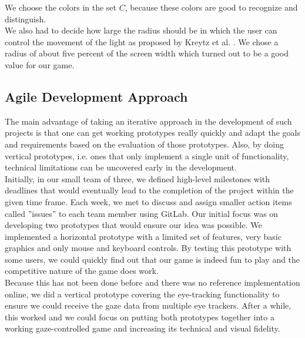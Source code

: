 \documentclass{sigchi}
\begin{document}
We choose the colors in the set $C$, because these colors are good to recognize and distinguish.\\
We also had to decide how large the radius should be in which the user can control the movement of the light as proposed by Kreytz et al. \cite{krejtz2014gaze}. We chose a radius of about five percent of the screen width which turned out to be a good value for our game.

\subsection{Agile Development Approach}
The main advantage of taking an iterative approach in the development of such projects is that one can get working prototypes really quickly and adapt the goals and requirements based on the evaluation of those prototypes. Also, by doing vertical prototypes, i.e. ones that only implement a single unit of functionality, technical limitations can be uncovered early in the development.\\
Initially, in our small team of three, we defined high-level milestones with deadlines that would eventually lead to the completion of the project within the given time frame. Each week, we met to discuss and assign smaller action items called ''issues'' to each team member using GitLab. Our initial focus was on developing two prototypes that would ensure our idea was possible. We implemented a horizontal prototype with a limited set of features, very basic graphics and only mouse and keyboard controls. By testing this prototype with some users, we could quickly find out that our game is indeed fun to play and the competitive nature of the game does work.\\
Because this has not been done before and there was no reference implementation online, we did a vertical prototype covering the eye-tracking functionality to ensure we could receive the gaze data from multiple eye trackers. After a while, this worked and we could focus on putting both prototypes together into a working gaze-controlled game and increasing its technical and visual fidelity.
\end{document}
